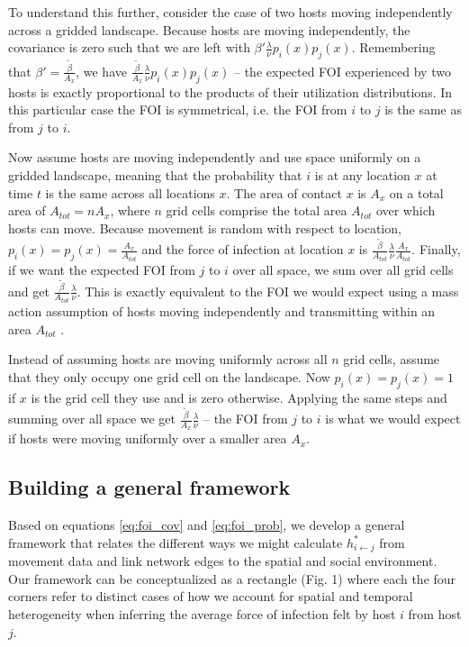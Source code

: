 \documentclass[letterpaper]{article}
\begin{document}
To understand this further, consider the case of two hosts moving independently across a gridded landscape.  Because hosts are moving independently, the covariance is zero such that we are left with $\beta' \frac{\lambda}{\nu} p_i(x)p_j(x)$.  Remembering that $\beta' = \frac{\tilde{\beta}}{A_x}$, we have $\frac{\tilde{\beta}}{A_x} \frac{\lambda}{\nu} p_i(x)p_j(x)$ -- the expected FOI experienced by two hosts is exactly proportional to the products of their utilization distributions. In this particular case the FOI is symmetrical, i.e. the FOI from $i$ to $j$ is the same as from $j$ to $i$.

Now assume hosts are moving independently and use space uniformly on a gridded landscape, meaning that the probability that $i$ is at any location $x$ at time $t$ is the same across all locations $x$. The area of contact $x$ is $A_x$ on a total area of $A_{tot} = n A_x$, where $n$ grid cells comprise the total area $A_{tot}$ over which hosts can move. Because movement is random with respect to location, $p_i(x) = p_j(x) = \frac{A_x}{A_{tot}}$ and the force of infection at location $x$ is $\frac{\tilde{\beta}}{A_{tot}} \frac{\lambda}{\nu} \frac{A_x}{A_{tot}}$.  Finally, if we want the expected FOI from $j$ to $i$ over all space, we sum over all grid cells and get $\frac{\tilde{\beta}}{A_{tot}} \frac{\lambda}{\nu}$. This is exactly equivalent to the FOI we would expect using a mass action assumption of hosts moving independently and transmitting within an area $A_{tot}$ \citep{McCallum2001}.

Instead of assuming hosts are moving uniformly across all $n$ grid cells, assume that they only occupy one grid cell on the landscape.  Now $p_i(x) = p_j(x) = 1$ if $x$ is the grid cell they use and is zero otherwise.  Applying the same steps and summing over all space we get $\frac{\tilde{\beta}}{A_{x}} \frac{\lambda}{\nu}$ -- the FOI from $j$ to $i$ is what we would expect if hosts were moving uniformly over a smaller area $A_x$. 

\subsection*{Building a general framework}

Based on equations \ref{eq:foi_cov} and \ref{eq:foi_prob}, we develop a general framework that relates the different ways we might calculate $h^*_{i \leftarrow j}$ from movement data and link network edges to the spatial and social environment. Our framework can be conceptualized as a rectangle (Fig. 1) where each the four corners refer to distinct cases of how we account for spatial and temporal heterogeneity when inferring the average force of infection felt by host $i$ from host $j$.  
\end{document}
